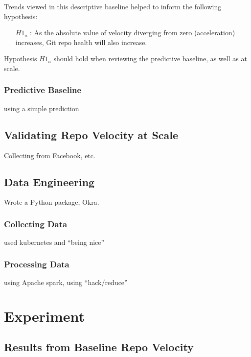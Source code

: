 \documentclass{article}
\begin{document}
Trends viewed in this descriptive baseline helped to inform the following
hypothesis:

\begin{itemize}
\item[$H1_{a}$]: As the absolute value of velocity diverging from zero
  (acceleration) increases, Git repo health will also increase.
\end{itemize}

Hypothesis $H1_{a}$ should hold when reviewing the predictive baseline,
as well as at scale.


\subsubsection{Predictive Baseline}

using a simple prediction

\subsection{Validating Repo Velocity at Scale}

Collecting from Facebook, etc.

\subsection{Data Engineering}

Wrote a Python package, Okra.

\subsubsection{Collecting Data}

used kubernetes and ``being nice''

\subsubsection{Processing Data}

using Apache spark, using ``hack/reduce''

\section{Experiment}

\subsection{Results from Baseline Repo Velocity}
\end{document}
